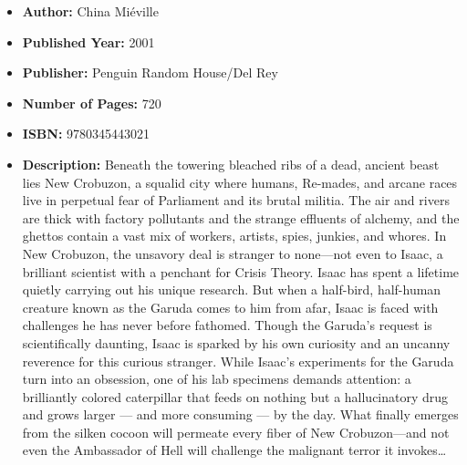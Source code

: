 \documentclass{tufte-handout}
\begin{document}
\begin{itemize}
    \item[] \textbf{Author:} China Miéville
    \item[] \textbf{Published Year:} 2001 
    \item[] \textbf{Publisher:} Penguin Random House/Del Rey
    \item[] \textbf{Number of Pages:} 720      
    \item[] \textbf{ISBN:} 9780345443021
    \item[] \textbf{Description:} Beneath the towering bleached ribs of a dead, ancient beast lies New Crobuzon, a squalid city where humans, Re-mades, and arcane races live in perpetual fear of Parliament and its brutal militia. The air and rivers are thick with factory pollutants and the strange effluents of alchemy, and the ghettos contain a vast mix of workers, artists, spies, junkies, and whores. In New Crobuzon, the unsavory deal is stranger to none—not even to Isaac, a brilliant scientist with a penchant for Crisis Theory. Isaac has spent a lifetime quietly carrying out his unique research. But when a half-bird, half-human creature known as the Garuda comes to him from afar, Isaac is faced with challenges he has never before fathomed. Though the Garuda’s request is scientifically daunting, Isaac is sparked by his own curiosity and an uncanny reverence for this curious stranger. While Isaac’s experiments for the Garuda turn into an obsession, one of his lab specimens demands attention: a brilliantly colored caterpillar that feeds on nothing but a hallucinatory drug and grows larger --- and more consuming --- by the day. What finally emerges from the silken cocoon will permeate every fiber of New Crobuzon—and not even the Ambassador of Hell will challenge the malignant terror it invokes\ldots \end{itemize}
\end{document}
